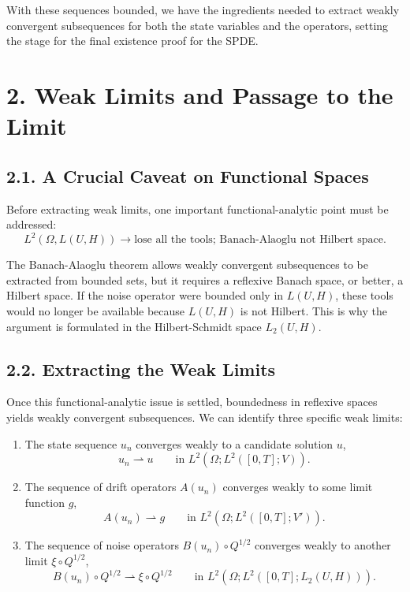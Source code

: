 \documentclass[11pt]{article}
\theoremstyle{definition}
\theoremstyle{remark}
\begin{document}
With these sequences bounded, we have the ingredients needed to extract weakly convergent subsequences for both the state variables and the operators, setting the stage for the final existence proof for the SPDE.

\section*{2. Weak Limits and Passage to the Limit}

\subsection*{2.1. A Crucial Caveat on Functional Spaces}
Before extracting weak limits, one important functional-analytic point must be addressed:
\[
L^2(\Omega,L(U,H)) \to \text{lose all the tools; Banach-Alaoglu not Hilbert space}.
\]

The Banach-Alaoglu theorem allows weakly convergent subsequences to be extracted from bounded sets, but it requires a reflexive Banach space, or better, a Hilbert space. If the noise operator were bounded only in \(L(U,H)\), these tools would no longer be available because \(L(U,H)\) is not Hilbert. This is why the argument is formulated in the Hilbert-Schmidt space \(L_2(U,H)\).

\subsection*{2.2. Extracting the Weak Limits}
Once this functional-analytic issue is settled, boundedness in reflexive spaces yields weakly convergent subsequences. We can identify three specific weak limits:
\begin{enumerate}
\item The state sequence \(u_n\) converges weakly to a candidate solution \(u\),
\[
u_n\rightharpoonup u
\qquad
\text{in } L^2(\Omega;L^2([0,T];V)).
\]

\item The sequence of drift operators \(A(u_n)\) converges weakly to some limit function \(g\),
\[
A(u_n)\rightharpoonup g
\qquad
\text{in } L^2(\Omega;L^2([0,T];V')).
\]

\item The sequence of noise operators \(B(u_n)\circ Q^{1/2}\) converges weakly to another limit \(\xi\circ Q^{1/2}\),
\[
B(u_n)\circ Q^{1/2}\rightharpoonup \xi\circ Q^{1/2}
\qquad
\text{in } L^2(\Omega;L^2([0,T];L_2(U,H))).
\]
\end{enumerate}
\end{document}
